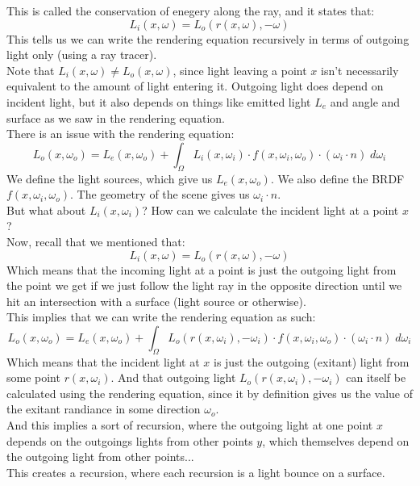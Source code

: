 \documentclass[12pt]{article}
\begin{document}
This is called the conservation of enegery along the ray,
and it states that:
\[ L_i(x, \omega) = L_o(r(x, \omega), -\omega) \]
This tells us we can write the rendering equation recursively
in terms of outgoing light only (using a ray tracer). \\

Note that $L_i(x, \omega) \neq L_o(x, \omega)$,
since light leaving a point $x$ isn't
necessarily equivalent to the amount of light
entering it.
Outgoing light does depend on incident light,
but it also depends on things like emitted light $L_e$
and angle and surface as we saw in 
the rendering equation. \\

There is an issue with the rendering equation:
\[ L_{o}(x, \omega_o)
= L_{e}(x, \omega_o)
+ \int_\Omega L_{i}(x, \omega_i) \cdot
f(x, \omega_i, \omega_o) \cdot
(\omega_i \cdot n) \; d\omega_i \]
We define the light sources, 
which give us $L_{e}(x, \omega_o)$.
We also define the BRDF $f(x, \omega_i, \omega_o)$.
The geometry of the scene gives us $\omega_i \cdot n$. \\
But what about $L_{i}(x, \omega_i)$?
How can we calculate the incident light
at a point $x$? \\

Now, recall that we mentioned that:
\[ L_i(x, \omega) = L_o(r(x, \omega), -\omega) \]
Which means that the incoming light at a point
is just the outgoing light from the point
we get if we just follow the light ray
in the opposite direction until we hit
an intersection with a surface (light source
or otherwise). \\
This implies that we can write the rendering
equation as such:
\[ L_{o}(x, \omega_o)
= L_{e}(x, \omega_o)
+ \int_\Omega L_o(r(x, \omega_i), -\omega_i)  \cdot
f(x, \omega_i, \omega_o) \cdot
(\omega_i \cdot n) \; d\omega_i \]
Which means that the incident light at $x$
is just the outgoing (exitant) light 
from some point $r(x, \omega_i)$.
And that outgoing light $L_o(r(x, \omega_i), -\omega_i)$
can itself be calculated using the rendering
equation, since it by definition
gives us the value of the exitant randiance
in some direction $\omega_o$. \\

And this implies a sort of recursion,
where the outgoing light at one point $x$
depends on the outgoings lights from other points $y$,
which themselves depend on the outgoing light
from other points... \\
This creates a recursion, where each recursion
is a light bounce on a surface. \\
\end{document}
